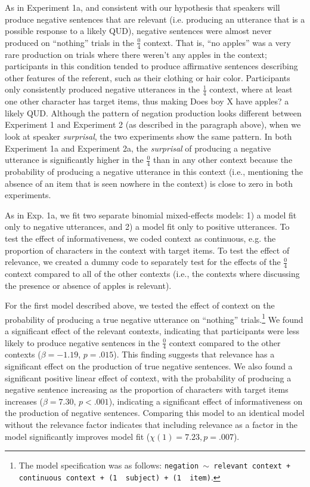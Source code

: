 \documentclass[man, floatsintext, noapacite]{apa6}
\begin{document}
As in Experiment 1a, and consistent with our hypothesis that speakers will produce negative sentences that are relevant (i.e. producing an utterance that is a possible response to a likely QUD), negative sentences were almost never produced on “nothing” trials in the $\frac{0}{4}$ context. That is, “no apples” was a very rare production on trials where there weren’t any apples in the context; participants in this condition tended to produce affirmative sentences describing other features of the referent, such as their clothing or hair color. Participants only consistently produced negative utterances in the $\frac{1}{4}$ context, where at least one other character has target items, thus making Does boy X have apples? a likely QUD. Although the pattern of negation production looks different between Experiment 1 and Experiment 2 (as described in the paragraph above), when we look at speaker \textit{surprisal}, the two experiments show the same pattern. In both Experiment 1a and Experiment 2a, the \textit{surprisal} of producing a negative utterance is significantly higher in the $\frac{0}{4}$ than in any other context because the probability of producing a negative utterance in this context (i.e., mentioning the absence of an item that is seen nowhere in the context) is close to zero in both experiments. 

As in Exp. 1a, we fit two separate binomial mixed-effects models: 1) a model fit only to negative utterances, and 2) a model fit only to positive utterances. To test the effect of informativeness, we coded context as continuous, e.g. the proportion of characters in the context with target items. To test the effect of relevance, we created a dummy code to separately test for the effects of the  $\frac{0}{4}$ context compared to all of the other contexts (i.e., the contexts where discussing the presence or absence of apples is relevant). 

For the first model described above, we tested the effect of context on the probability of producing a true negative utterance on ``nothing'' trials.\footnote{The model specification was as follows: \texttt{negation $\sim$  relevant context + continuous context + (1~\textbar~subject) +  (1~\textbar~item)}.} We  found a significant effect of the relevant contexts, indicating that participants were less likely to produce negative sentences in the $\frac{0}{4}$ context compared to the other contexts ($\beta= -1.19$, $p = .015$). This finding suggests that relevance has a significant effect on the production of true negative sentences. We also found a significant positive linear effect of context, with the probability of producing a negative sentence increasing as the proportion of characters with target items increases ($\beta= 7.30$, $p< .001$), indicating a significant effect of informativeness on the production of negative sentences. Comparing this model to an identical model without the relevance factor indicates that including relevance as a factor in the model significantly improves model fit ($\chi(1)= 7.23, p = .007$). 
\end{document}
